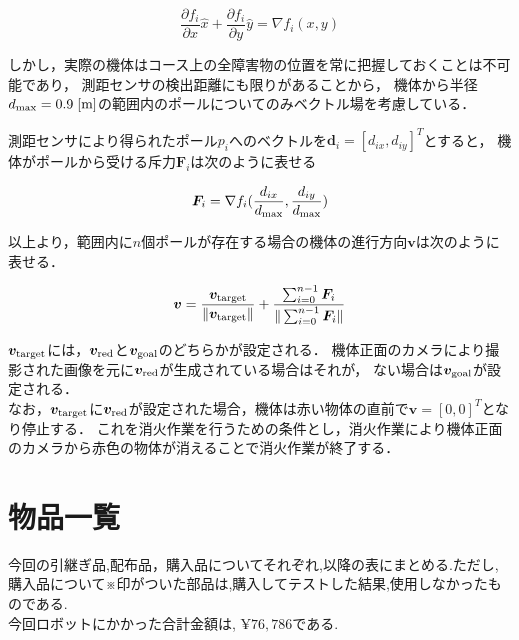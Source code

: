 \documentclass[11pt,a4]{jsarticle}
\begin{document}
  \begin{equation}
    \frac{\partial f_i}{\partial x}\hat{x} + \frac{\partial f_i}{\partial y}\hat{y} = \nabla f_i(x,y)
  \end{equation}

  しかし，実際の機体はコース上の全障害物の位置を常に把握しておくことは不可能であり，
  測距センサの検出距離にも限りがあることから，
  機体から半径$d_{\rm{max}} = 0.9 \hspace{1mm}\mathrm{[m]}$の範囲内のポールについてのみベクトル場を考慮している．

  測距センサにより得られたポール$p_i$へのベクトルを$\bm{d}_i = [d_{ix}, d_{iy}]^{T}$とすると，
  機体がポールから受ける斥力$\bm{F}_i$は次のように表せる

  \begin{equation}
    \bm{F}_i = \nabla f_i(\frac{d_{ix}}{d_{\rm{max}}}, \frac{d_{iy}}{d_{\rm{max}}})
  \end{equation}

  以上より，範囲内に$n$個ポールが存在する場合の機体の進行方向$\bm{v}$は次のように表せる．

  \begin{equation}
    \bm{v} = \frac{\bm{v}_{\rm{target}}}{\|\bm{v}_{\rm{target}}\|} + \frac{\sum_{i=0}^{n-1}{\bm{F}_i}}{\|\sum_{i=0}^{n-1}{\bm{F}_i}\|}
  \end{equation}

  $\bm{v}_{\rm{target}}$には，$\bm{v}_{\rm{red}}$と$\bm{v}_{\rm{goal}}$のどちらかが設定される．
  機体正面のカメラにより撮影された画像を元に$\bm{v}_{\rm{red}}$が生成されている場合はそれが，
  ない場合は$\bm{v}_{\rm{goal}}$が設定される．\\

  なお，$\bm{v}_{\rm{target}}$に$\bm{v}_{\rm{red}}$が設定された場合，機体は赤い物体の直前で$\bm{v} = [0, 0]^{T}$となり停止する．
  これを消火作業を行うための条件とし，消火作業により機体正面のカメラから赤色の物体が消えることで消火作業が終了する．


\newpage
\section{物品一覧}
今回の引継ぎ品,配布品，購入品についてそれぞれ,以降の表にまとめる.ただし,購入品について※印がついた部品は,購入してテストした結果,使用しなかったものである.\\

今回ロボットにかかった合計金額は, $\yen 76,786$である.
\end{document}
